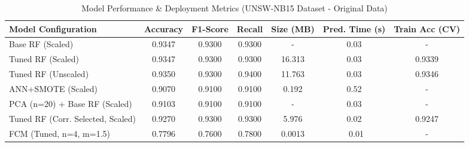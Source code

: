 \documentclass[sigconf,screen,final,nonacm]{acmart}
\begin{document}
\begin{table*}[ht]
  \caption{Model Performance \& Deployment Metrics (UNSW-NB15 Dataset - Original Data)}
  \label{tab:unsw_results}
  \centering
  \small %
  \begin{tabular}{l S S S S[round-precision=3, table-format=2.3] S[round-precision=2, table-format=1.2] S[round-precision=4, table-format=1.4]} %
    \toprule
    \textbf{Model Configuration} & {\textbf{Accuracy}} & {\textbf{F1-Score}} & {\textbf{Recall}} & {\textbf{Size (MB)}} & {\textbf{Pred. Time (s)}} & {\textbf{Train Acc (CV)}} \\ %
    \midrule
    Base RF (Scaled)            & 0.9347 & 0.9300 & 0.9300 & {-}    & 0.03 & {-} \\ %
    Tuned RF (Scaled)           & 0.9347 & 0.9300 & 0.9300 & 16.313 & 0.03 & 0.9339 \\ %
    Tuned RF (Unscaled)         & 0.9350 & 0.9300 & 0.9400 & 11.763 & 0.03 & 0.9346 \\ %
    ANN+SMOTE (Scaled)          & 0.9070 & 0.9100 & 0.9100 & 0.192  & 0.52 & {-} \\ %
    PCA (n=20) + Base RF (Scaled) & 0.9103 & 0.9100 & 0.9100 & {-}    & 0.03 & {-} \\ %
    Tuned RF (Corr. Selected, Scaled) & 0.9270 & 0.9300 & 0.9300 & 5.976  & 0.02 & 0.9247 \\ %
    FCM (Tuned, n=4, m=1.5)     & 0.7796 & 0.7600 & 0.7800 & 0.0013 & {~0.01} & {-} \\ %
    \bottomrule
  \end{tabular}
\end{table*}
\end{document}
